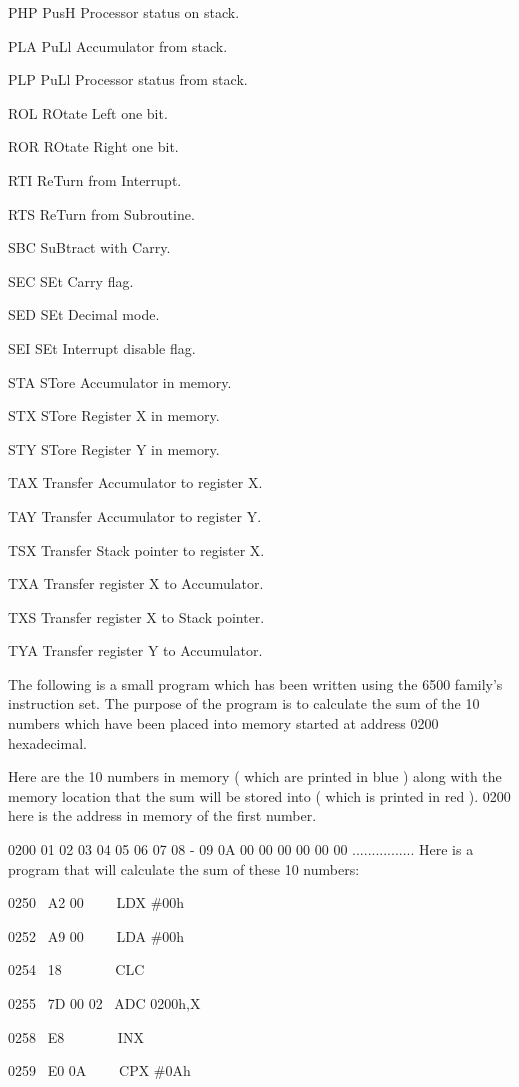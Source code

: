 \documentclass[12pt,oneside]{book}
\begin{document}
PHP PusH Processor status on stack.

PLA PuLl Accumulator from stack.

PLP PuLl Processor status from stack.

ROL ROtate Left one bit.

ROR ROtate Right one bit.

RTI ReTurn from Interrupt.

RTS ReTurn from Subroutine.

SBC SuBtract with Carry.

SEC SEt Carry flag.

SED SEt Decimal mode.

SEI SEt Interrupt disable flag.

STA STore Accumulator in memory.

STX STore Register X in memory.

STY STore Register Y in memory.

TAX Transfer Accumulator to register X.

TAY Transfer Accumulator to register Y.

TSX Transfer Stack pointer to register X.

TXA Transfer register X to Accumulator.

TXS Transfer register X to Stack pointer.

TYA Transfer register Y to Accumulator.


The following is a small program which has been written using the 6500 family's instruction set. The purpose of the program is to calculate the sum of the 10 numbers which have been placed into memory started at address 0200 hexadecimal. 

Here are the 10 numbers in memory ( which are printed in blue ) along with the memory location that the sum will be stored into ( which is printed in red ). 0200 here is the address in memory of the first number. 

0200 01 02 03 04 05 06 07 08 {}- 09 0A 00 00 00 00 00 00
................
Here is a program that will calculate the sum of these 10 numbers:


0250 \ A2 00 \ \ \ \ LDX \#00h

0252 \ A9 00 \ \ \ \ LDA \#00h

0254 \ 18 \ \ \ \ \ \ \ CLC 

0255 \ 7D 00 02 \ ADC 0200h,X

0258 \ E8 \ \ \ \ \ \ \ INX 

0259 \ E0 0A \ \ \ \ CPX \#0Ah
\end{document}
